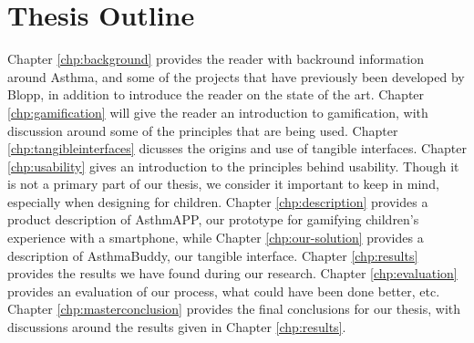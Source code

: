 \section{Thesis Outline}
Chapter \ref{chp:background} provides the reader with backround information around Asthma, and some of the projects that have previously been developed by Blopp, in addition to introduce the reader on the state of the art. 
Chapter \ref{chp:gamification} will give the reader an introduction to gamification, with discussion around some of the principles that are being used. 
Chapter \ref{chp:tangibleinterfaces} dicusses the origins and use of tangible interfaces.
Chapter \ref{chp:usability} gives an introduction to the principles behind usability. Though it is not a primary part of our thesis, we consider it important to keep in mind, especially when designing for children.
Chapter \ref{chp:description} provides a product description of AsthmAPP, our prototype for gamifying children's experience with a smartphone, while Chapter \ref{chp:our-solution} provides a description of AsthmaBuddy, our tangible interface.
Chapter \ref{chp:results} provides the results we have found during our research.
Chapter \ref{chp:evaluation} provides an evaluation of our process, what could have been done better, etc. 
Chapter \ref{chp:masterconclusion} provides the final conclusions for our thesis, with discussions around the results given in Chapter \ref{chp:results}.          
